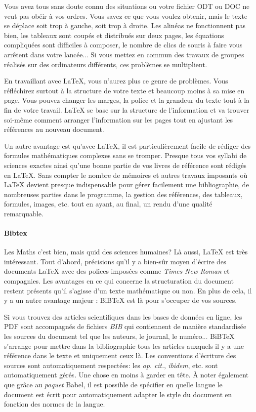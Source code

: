 \documentclass{../fiche}
\begin{document}
Vous avez tous sans doute connu des situations ou votre fichier ODT ou DOC ne veut pas obéir à vos ordres. Vous savez ce que vous voulez obtenir, mais le texte se déplace soit trop à gauche, soit trop à droite. Les alinéas ne fonctionnent pas bien, les tableaux sont coupés et distribués sur deux pages, les équations compliquées sont difficiles à composer, le nombre de clics de souris à faire vous arrêtent dans votre lancée... Si vous mettez en commun des travaux de groupes réalisés sur des ordinateurs différents, ces problèmes se multiplient.

En travaillant avec \LaTeX{}, vous n'aurez plus ce genre de problèmes. Vous réfléchirez surtout à la structure de votre texte et beaucoup moins à sa mise en page. Vous pouvez changer les marges, la police et la grandeur du texte tout à la fin de votre travail. \LaTeX{} se base sur la structure de l'information et va trouver soi-même comment arranger l'information sur les pages tout en ajustant les références au nouveau document.

Un autre avantage est qu'avec \LaTeX{}, il est particulièrement facile de rédiger des formules mathématiques complexes sans se tromper. Presque tous vos syllabi de sciences exactes ainsi qu'une bonne partie de vos livres de référence sont rédigés en \LaTeX{}. Sans compter le nombre de mémoires et autres travaux imposants où \LaTeX{} devient presque indispensable pour gérer facilement une bibliographie, de nombreuses parties dans le programme, la gestion des références, des tableaux, formules, images, etc. tout en ayant, au final, un rendu d'une qualité remarquable.

\paragraph{Bibtex}
Les Maths c'est bien, mais quid des sciences humaines? Là aussi, \LaTeX{} est très intéressant. Tout d'abord, précisions qu'il y a bien-sûr moyen d'écrire des documents \LaTeX{} avec des polices imposées comme \textit{Times New Roman} et compagnies.
Les avantages en ce qui concerne la structuration du document restent présents qu'il s'agisse d'un texte mathématique ou non. En plus de cela, il y a un autre avantage majeur : BiB\TeX{} est là pour s'occuper de vos sources.

Si vous trouvez des articles scientifiques dans les bases de données en ligne, les PDF sont accompagnés de fichiers \textit{BIB} qui contiennent de manière standardisée les sources du document tel que les auteurs, le journal, le numéro... BiB\TeX{} s'arrange pour mettre dans la bibliographie tous les articles auxquels il y a une référence dans le texte et uniquement ceux là. Les conventions d'écriture des sources sont automatiquement respectées: les \textit{op. cit.}, \textit{ibidem}, etc. sont automatiquement gérés. Une chose en moins à garder en tête.
À noter également que grâce au \textit{paquet} Babel, il est possible de spécifier en quelle langue le document est écrit pour automatiquement adapter le style du document en fonction des normes de la langue.
\end{document}
